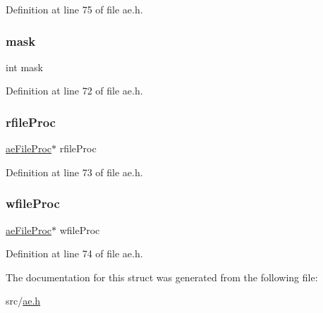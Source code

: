 Definition at line 75 of file ae.\+h.

\mbox{\label{structae_file_event_ab77cc972f3ee899689ba053015472ccd}} 
\subsubsection{\texorpdfstring{mask}{mask}}
{\footnotesize\ttfamily int mask}



Definition at line 72 of file ae.\+h.

\mbox{\label{structae_file_event_aaf65022bec2a73c459e46cbfb41229d3}} 
\subsubsection{\texorpdfstring{rfile\+Proc}{rfileProc}}
{\footnotesize\ttfamily \hyperlink{ae_8h_a26d6e9533f135cb463f29239607ba50c}{ae\+File\+Proc}$\ast$ rfile\+Proc}



Definition at line 73 of file ae.\+h.

\mbox{\label{structae_file_event_af95a1a47baf2ba0db91c96e77d01a7f0}} 
\subsubsection{\texorpdfstring{wfile\+Proc}{wfileProc}}
{\footnotesize\ttfamily \hyperlink{ae_8h_a26d6e9533f135cb463f29239607ba50c}{ae\+File\+Proc}$\ast$ wfile\+Proc}



Definition at line 74 of file ae.\+h.



The documentation for this struct was generated from the following file\+:\begin{DoxyCompactItemize}
\item 
src/\hyperlink{ae_8h}{ae.\+h}\end{DoxyCompactItemize}
